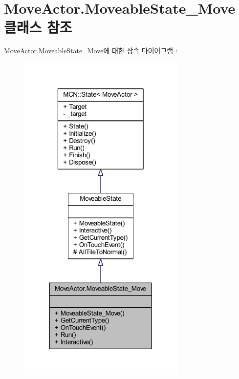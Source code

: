 \hypertarget{class_move_actor_1_1_moveable_state___move}{}\section{Move\+Actor.\+Moveable\+State\+\_\+\+Move 클래스 참조}
\label{class_move_actor_1_1_moveable_state___move}


Move\+Actor.\+Moveable\+State\+\_\+\+Move에 대한 상속 다이어그램 \+: \nopagebreak
\begin{figure}[H]
\begin{center}
\leavevmode
\includegraphics[width=237pt]{class_move_actor_1_1_moveable_state___move__inherit__graph}
\end{center}
\end{figure}


